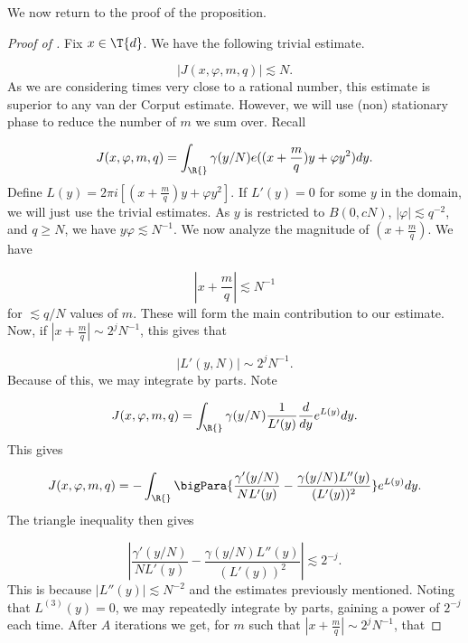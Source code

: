 \documentclass[11pt]{amsart}
\begin{document}
We now return to the proof of the proposition.
\begin{proof}[Proof of ]
   Fix $x\in\T{d}$. We have the following trivial estimate.

   \begin{equation*}
       |J(x,\varphi,m,q)|\lesssim N.
   \end{equation*}
   As we are considering times very close to a rational number, this estimate is superior to any van der Corput estimate. However, we will use (non) stationary phase to reduce the number of $m$ we sum over. Recall

   \begin{equation*}
       J(x,\varphi, m, q) =\int_{\R{}}\gamma(y/N)e((x+\frac{m}{q})y+\varphi y^2)dy.
   \end{equation*}
    Define $L(y) = 2\pi i[(x+\frac{m}{q})y+\varphi y^2]$. If $L'(y)=0$ for some $y$ in the domain, we will just use the trivial estimates. As $y$ is restricted to $B(0,cN)$, $|\varphi|\lesssim q^{-2}$, and $q\geq N$, we have $y\varphi\lesssim N^{-1}$. We now analyze the magnitude of $(x+\frac{m}{q})$. We have 

    \begin{equation*}
        |x+\frac{m}{q}|\lesssim N^{-1}
    \end{equation*}
    for $\lesssim q/N$ values of $m$. These will form the main contribution to our estimate. Now, if $|x+\frac{m}{q}|\sim 2^j N^{-1}$, this gives that

    \begin{equation*}
        |L'(y,N)|\sim 2^{j}N^{-1}.
    \end{equation*}
    Because of this, we may integrate by parts. Note

    \begin{equation*}
       J(x,\varphi, m, q) =\int_{\R{}}\gamma(y/N)\frac{1}{L'(y)}\frac{d}{dy}e^{L(y)}dy.
   \end{equation*}
   This gives

       \begin{equation*}
       J(x,\varphi, m, q) =-\int_{\R{}}\bigPara{\frac{\gamma'(y/N)}{NL'(y)}-\frac{\gamma(y/N)L''(y)}{(L'(y))^2}}e^{L(y)}dy.
   \end{equation*}
   The triangle inequality then gives

   $$|\frac{\gamma'(y/N)}{NL'(y)}-\frac{\gamma(y/N)L''(y)}{(L'(y))^2}|\lesssim 2^{-j}.$$
    This is because $|L''(y)|\lesssim N^{-2}$ and the estimates previously mentioned. Noting that $L^{(3)}(y)=0$, we may repeatedly integrate by parts, gaining a power of $2^{-j}$ each time. After $A$ iterations we get, for $m$ such that $|x+\frac{m}{q}|\sim 2^j N^{-1}$, that


\end{proof}
\end{document}
